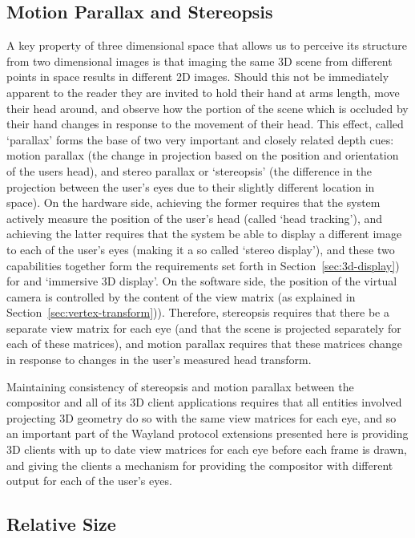 \subsection{Motion Parallax and Stereopsis}
\label{sec:motion-parallax-and-stereopsis}

A key property of three dimensional space that allows us to perceive its structure from two dimensional images is that imaging the same 3D scene from different points in space results in different 2D images. Should this not be immediately apparent to the reader they are invited to hold their hand at arms length, move their head around, and observe how the portion of the scene which is occluded by their hand changes in response to the movement of their head. This effect, called `parallax' forms the base of two very important and closely related depth cues: motion parallax (the change in projection based on the position and orientation of the users head), and stereo parallax or `stereopsis' (the difference in the projection between the user's eyes due to their slightly different location in space). On the hardware side, achieving the former requires that the system actively measure the position of the user's head (called `head tracking'), and achieving the latter requires that the system be able to display a different image to each of the user's eyes (making it a so called `stereo display'), and these two capabilities together form the requirements set forth in Section~\ref{sec:3d-display}) for and `immersive 3D display'. On the software side, the position of the virtual camera is controlled by the content of the view matrix (as explained in Section~\ref{sec:vertex-transform})). Therefore, stereopsis requires that there be a separate view matrix for each eye (and that the scene is projected separately for each of these matrices), and motion parallax requires that these matrices change in response to changes in the user's measured head transform.

Maintaining consistency of stereopsis and motion parallax between the compositor and all of its 3D client applications requires that all entities involved projecting 3D geometry do so with the same view matrices for each eye, and so an important part of the Wayland protocol extensions presented here is providing 3D clients with up to date view matrices for each eye before each frame is drawn, and giving the clients a mechanism for providing the compositor with different output for each of the user's eyes.

\subsection{Relative Size}

